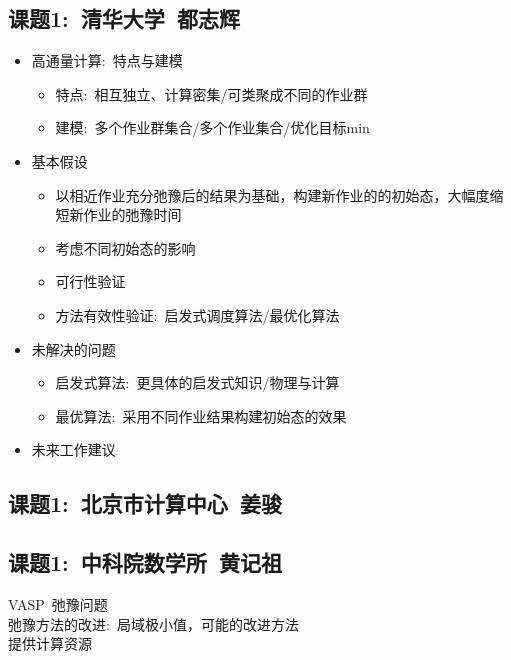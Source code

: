 \documentclass[10pt,a4paper]{article}
\begin{document}
\begin{itemize}
\subsection{课题1:~清华大学~都志辉}
\begin{itemize}
	\item 高通量计算:~特点与建模
		\begin{itemize}
			\item 特点:~相互独立、计算密集/可类聚成不同的作业群
			\item 建模:~多个作业群集合/多个作业集合/优化目标\textrm{min}
		\end{itemize}
	\item 基本假设
		\begin{itemize}
			\item 以相近作业充分弛豫后的结果为基础，构建新作业的的初始态，大幅度缩短新作业的弛豫时间
			\item 考虑不同初始态的影响
			\item 可行性验证
			\item 方法有效性验证:~启发式调度算法/最优化算法
		\end{itemize}
	\item 未解决的问题
		\begin{itemize}
			\item 启发式算法:~更具体的启发式知识/物理与计算
			\item 最优算法:~采用不同作业结果构建初始态的效果
		\end{itemize}
	\item 未来工作建议
\end{itemize}

\subsection{课题1:~北京市计算中心~姜骏}

\subsection{课题1:~中科院数学所~黄记祖}
\textrm{VASP~}弛豫问题\\
弛豫方法的改进:~局域极小值，可能的改进方法\\
提供计算资源


\end{itemize}
\end{document}
